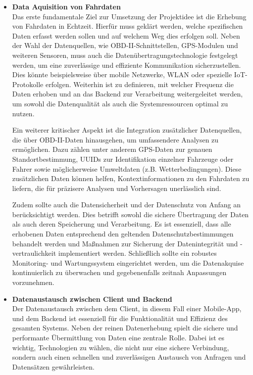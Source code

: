 \documentclass[oneside]{ausarbeitung}
\begin{document}
\begin{itemize}
  \item \textbf{Data Aquisition von Fahrdaten}\\ Das erste fundamentale Ziel zur Umsetzung der Projektidee ist die Erhebung von Fahrdaten in Echtzeit. Hierfür muss geklärt werden, welche spezifischen Daten erfasst werden sollen und auf welchem Weg dies erfolgen soll. Neben der Wahl der Datenquellen, wie OBD-II-Schnittstellen, GPS-Modulen und weiteren Sensoren, muss auch die Datenübertragungstechnologie festgelegt werden, um eine zuverlässige und effiziente Kommunikation sicherzustellen. Dies könnte beispielsweise über mobile Netzwerke, WLAN oder spezielle IoT-Protokolle erfolgen. Weiterhin ist zu definieren, mit welcher Frequenz die Daten erhoben und an das Backend zur Verarbeitung weitergeleitet werden, um sowohl die Datenqualität als auch die Systemressourcen optimal zu nutzen.
  
  Ein weiterer kritischer Aspekt ist die Integration zusätzlicher Datenquellen, die über OBD-II-Daten hinausgehen, um umfassendere Analysen zu ermöglichen. Dazu zählen unter anderem GPS-Daten zur genauen Standortbestimmung, UUIDs zur Identifikation einzelner Fahrzeuge oder Fahrer sowie möglicherweise Umweltdaten (z.B. Wetterbedingungen). Diese zusätzlichen Daten können helfen, Kontextinformationen zu den Fahrdaten zu liefern, die für präzisere Analysen und Vorhersagen unerlässlich sind.
  
  Zudem sollte auch die Datensicherheit und der Datenschutz von Anfang an berücksichtigt werden. Dies betrifft sowohl die sichere Übertragung der Daten als auch deren Speicherung und Verarbeitung. Es ist essenziell, dass alle erhobenen Daten entsprechend den geltenden Datenschutzbestimmungen behandelt werden und Maßnahmen zur Sicherung der Datenintegrität und -vertraulichkeit implementiert werden. Schließlich sollte ein robustes Monitoring- und Wartungssystem eingerichtet werden, um die Datenakquise kontinuierlich zu überwachen und gegebenenfalls zeitnah Anpassungen vorzunehmen.
  
  \item \textbf{Datenaustausch zwischen Client und Backend}\\ Der Datenaustausch zwischen dem Client, in diesem Fall einer Mobile-App, und dem Backend ist essenziell für die Funktionalität und Effizienz des gesamten Systems. Neben der reinen Datenerhebung spielt die sichere und performante Übermittlung von Daten eine zentrale Rolle. Dabei ist es wichtig, Technologien zu wählen, die nicht nur eine sichere Verbindung, sondern auch einen schnellen und zuverlässigen Austausch von Anfragen und Datensätzen gewährleisten.
  

\end{itemize}
\end{document}
